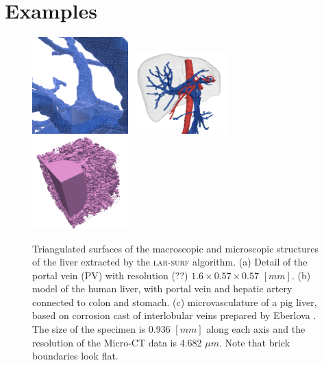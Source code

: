
\section{Examples}\label{sec:examples}


\begin{figure}[tbp]
\includegraphics[height=0.3\textwidth,width=0.33\textwidth]{figs/image-1.png}%
\includegraphics[height=0.3\textwidth,width=0.33\textwidth]{figs/image-2.png}%
\includegraphics[height=0.3\textwidth,width=0.33\textwidth]{figs/image-3.png}%
\caption{\small Triangulated surfaces of the macroscopic and microscopic structures of the liver extracted by the \textsc{lar-surf} algorithm. 
(a) Detail of the portal vein (PV) with resolution (??) $1.6\times0.57\times0.57$ $[mm]$.
(b) model of the human liver, with portal vein and hepatic artery connected to colon and stomach.
(c) microvasculature of a pig liver, based on corrosion cast of interlobular veins prepared by Eberlova
\cite{eberlova2017use}. The size of the specimen is 0.936 $[mm]$ along each axis and the resolution of the Micro-CT data is 4.682 $\mu{}m$. Note that brick boundaries look flat.
}
\label{fig:schema}
\end{figure}

